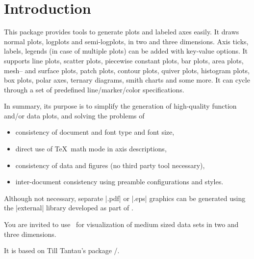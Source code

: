 
\chapter{Introduction}
This package provides tools to generate plots and labeled axes easily. It draws normal plots, logplots and semi-logplots, in two and three dimensions. Axis ticks, labels, legends (in case of multiple plots) can be added with key-value options. It supports line plots, scatter plots, piecewise constant plots, bar plots, area plots, mesh-- and surface plots, patch plots, contour plots, quiver plots, histogram plots, box plots, polar axes, ternary diagrams, smith charts and some more.
It can cycle through a set of predefined line/marker/color specifications.

In summary, its purpose is to simplify the generation of high-quality function and/or data plots, and solving the problems of
\begin{itemize}
	\item consistency of document and font type and font size,
	\item direct use of \TeX\ math mode in axis descriptions,
	\item consistency of data and figures (no third party tool necessary),
	\item inter-document consistency using preamble configurations and styles.
\end{itemize}
Although not necessary, separate |.pdf| or |.eps| graphics can be generated using the |external| library developed as part of \Tikz.

You are invited to use \PGFPlots\ for visualization of medium sized data sets in two and three dimensions.

It is based on Till Tantau's package \PGF/\Tikz.
